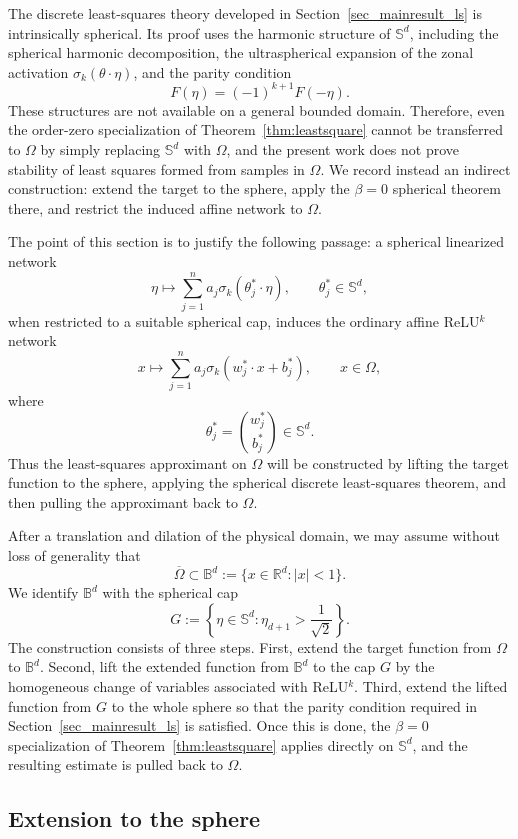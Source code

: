 \documentclass{article}
\numberwithin{equation}{section}
\def\RR{\mathbb{R}}
\def\BB{\mathbb{B}}
\def\SS{\mathbb{S}}
\begin{document}
The discrete least-squares theory developed in Section~\ref{sec_mainresult_ls} is intrinsically spherical. Its proof uses the harmonic structure of $\SS^d$, including the spherical harmonic decomposition, the ultraspherical expansion of the zonal activation $\sigma_k(\theta\cdot\eta)$, and the parity condition
\[
    F(\eta)=(-1)^{k+1}F(-\eta).
\]
These structures are not available on a general bounded domain. Therefore, even the order-zero specialization of Theorem~\ref{thm:leastsquare} cannot be transferred to $\Omega$ by simply replacing $\SS^d$ with $\Omega$, and the present work does not prove stability of least squares formed from samples in $\Omega$. We record instead an indirect construction: extend the target to the sphere, apply the $\beta=0$ spherical theorem there, and restrict the induced affine network to $\Omega$.

The point of this section is to justify the following passage:
a spherical linearized network
\[
    \eta\mapsto
    \sum_{j=1}^n a_j\sigma_k(\theta_j^*\cdot\eta),
    \qquad \theta_j^*\in\SS^d,
\]
when restricted to a suitable spherical cap, induces the ordinary affine
ReLU$^k$ network
\[
    x\mapsto
    \sum_{j=1}^n a_j\sigma_k(w_j^*\cdot x+b_j^*),
    \qquad x\in\Omega,
\]
where
\[
    \theta_j^*=\binom{w_j^*}{b_j^*}\in\SS^d .
\]
Thus the least-squares approximant on $\Omega$ will be constructed by lifting
the target function to the sphere, applying the spherical discrete
least-squares theorem, and then pulling the approximant back to $\Omega$.

After a translation and dilation of the physical domain, we may assume
without loss of generality that
\[
    \overline\Omega\subset \BB^d
    :=
    \{x\in\RR^d: |x|<1\}.
\]
We identify $\BB^d$ with the spherical cap
\[
    G
    :=
    \left\{
        \eta\in\SS^d:
        \eta_{d+1}> \frac1{\sqrt2}
    \right\}.
\]
The construction consists of three steps.  First, extend the target
function from $\Omega$ to $\BB^d$.  Second, lift the extended function from
$\BB^d$ to the cap $G$ by the homogeneous change of variables associated
with ReLU$^k$.  Third, extend the lifted function from $G$ to the whole
sphere so that the parity condition required in Section~\ref{sec_mainresult_ls}
is satisfied. Once this is done, the $\beta=0$ specialization of Theorem~\ref{thm:leastsquare} applies
directly on $\SS^d$, and the resulting estimate is pulled back to
$\Omega$.


\subsection{Extension to the sphere}
\end{document}
